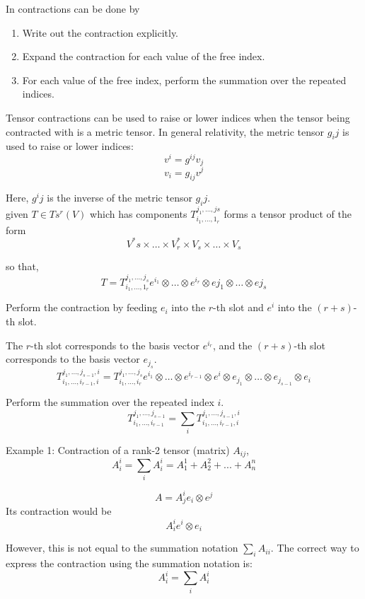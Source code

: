 In contractions can be done by
\begin{enumerate}
\item Write out the contraction explicitly.
\item Expand the contraction for each value of the free index.
\item For each value of the free index, perform the summation over the repeated indices.
\end{enumerate}


Tensor contractions can be used to raise or lower indices when the tensor being contracted with
is a metric tensor.
In general relativity, the metric tensor $g_ij$ is used to raise or lower indices:
$$
v^i = g^{ij} v_j
$$
$$
v_i = g_{ij} v^j
$$

Here, $g^ij$ is the inverse of the metric tensor $g_ij$.
\\


given $T \in T{s}^{r} (V)$ which has components $T_{i_1, \dots , 1_r }^{j_1 , \dots , js}$
forms a tensor product of the form
$$ 
V^{*}{s} \times \dots \times V^{*}_{r} \times V_s \times \dots \times V_s
$$

so that,
$$
T = T_{i_1, \dots , 1_r }^{j_1 , \dots , j_s} e^{i_1} \otimes \dots \otimes e^{i_r} \otimes e{j_1} \otimes \dots \otimes e{j_s}
$$



Perform the contraction by feeding $e_i$ into the $r$-th slot and $e^i$ into the $(r+s)$-th slot.

The $r$-th slot corresponds to the basis vector $e^{i_r}$, and the $(r+s)$-th slot corresponds to the basis vector $e_{j_s}$.
$$
T_{i_1, \dots, i_{r-1}, i}^{j_1, \dots, j_{s-1}, i} =
T_{i_1, \dots, i_r}^{j_1, \dots, j_s} e^{i_1} \otimes \dots \otimes e^{i_{r-1}} \otimes e^i \otimes e_{j_1} \otimes \dots \otimes e_{j_{s-1}} \otimes e_i
$$

Perform the summation over the repeated index $i$.
$$
T_{i_1, \dots, i_{r-1}}^{j_1, \dots, j_{s-1}} = \sum_i T_{i_1, \dots, i_{r-1}, i}^{j_1, \dots, j_{s-1}, i}
$$


Example 1: Contraction of a rank-2 tensor (matrix) $A_{ij}$,
$$
A^i_i = \sum_i A^i_i = A^1_1 + A^2_2 + ... + A^n_n
$$

$$
A = A^i_j e_i \otimes e^j
$$
Its contraction would be
$$
A_{i}^{i} e^i \otimes e_i
$$

However, this is not equal to the summation notation $\sum_i A_{ii}$.
The correct way to express the contraction using the summation notation is:
$$
A^i_i = \sum_i A^i_i
$$

